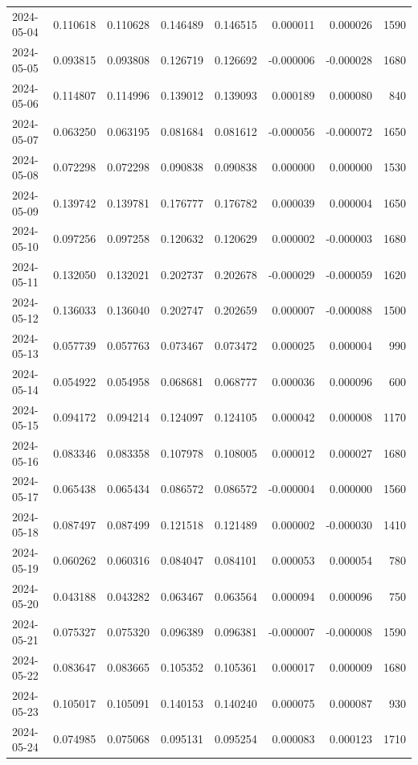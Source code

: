 \begin{tabular}{lrrrrrrr}
2024-05-04 & 0.110618 & 0.110628 & 0.146489 & 0.146515 & 0.000011 & 0.000026 & 1590 \\
2024-05-05 & 0.093815 & 0.093808 & 0.126719 & 0.126692 & -0.000006 & -0.000028 & 1680 \\
2024-05-06 & 0.114807 & 0.114996 & 0.139012 & 0.139093 & 0.000189 & 0.000080 & 840 \\
2024-05-07 & 0.063250 & 0.063195 & 0.081684 & 0.081612 & -0.000056 & -0.000072 & 1650 \\
2024-05-08 & 0.072298 & 0.072298 & 0.090838 & 0.090838 & 0.000000 & 0.000000 & 1530 \\
2024-05-09 & 0.139742 & 0.139781 & 0.176777 & 0.176782 & 0.000039 & 0.000004 & 1650 \\
2024-05-10 & 0.097256 & 0.097258 & 0.120632 & 0.120629 & 0.000002 & -0.000003 & 1680 \\
2024-05-11 & 0.132050 & 0.132021 & 0.202737 & 0.202678 & -0.000029 & -0.000059 & 1620 \\
2024-05-12 & 0.136033 & 0.136040 & 0.202747 & 0.202659 & 0.000007 & -0.000088 & 1500 \\
2024-05-13 & 0.057739 & 0.057763 & 0.073467 & 0.073472 & 0.000025 & 0.000004 & 990 \\
2024-05-14 & 0.054922 & 0.054958 & 0.068681 & 0.068777 & 0.000036 & 0.000096 & 600 \\
2024-05-15 & 0.094172 & 0.094214 & 0.124097 & 0.124105 & 0.000042 & 0.000008 & 1170 \\
2024-05-16 & 0.083346 & 0.083358 & 0.107978 & 0.108005 & 0.000012 & 0.000027 & 1680 \\
2024-05-17 & 0.065438 & 0.065434 & 0.086572 & 0.086572 & -0.000004 & 0.000000 & 1560 \\
2024-05-18 & 0.087497 & 0.087499 & 0.121518 & 0.121489 & 0.000002 & -0.000030 & 1410 \\
2024-05-19 & 0.060262 & 0.060316 & 0.084047 & 0.084101 & 0.000053 & 0.000054 & 780 \\
2024-05-20 & 0.043188 & 0.043282 & 0.063467 & 0.063564 & 0.000094 & 0.000096 & 750 \\
2024-05-21 & 0.075327 & 0.075320 & 0.096389 & 0.096381 & -0.000007 & -0.000008 & 1590 \\
2024-05-22 & 0.083647 & 0.083665 & 0.105352 & 0.105361 & 0.000017 & 0.000009 & 1680 \\
2024-05-23 & 0.105017 & 0.105091 & 0.140153 & 0.140240 & 0.000075 & 0.000087 & 930 \\
2024-05-24 & 0.074985 & 0.075068 & 0.095131 & 0.095254 & 0.000083 & 0.000123 & 1710 \\

\end{tabular}
